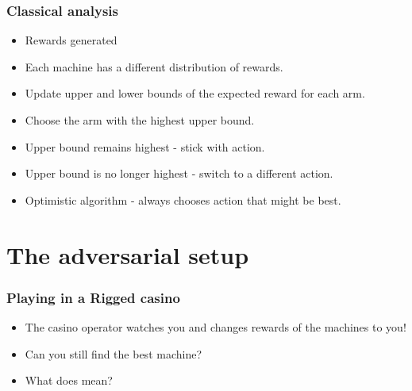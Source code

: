 \documentclass{beamer}
\begin{document}
\begin{frame}
\frametitle{Classical analysis}
\begin{itemize}
\item Rewards generated 
\item Each machine has a different distribution of rewards.
\item Update upper and lower bounds of the expected reward for each arm.
\item Choose the arm with the highest upper bound. 
\item {} Upper bound remains highest - stick with action.
\item {} Upper bound is no longer highest -
  switch to a different action.
\item Optimistic algorithm - always chooses action that might be best.
\end{itemize}
\end{frame}

\section{The adversarial setup}

\begin{frame}
\frametitle{Playing in a Rigged casino}
\begin{itemize}
\item The casino operator watches you and changes rewards of the
  machines to  you!
\item Can you still find the best machine?
\item What does  mean?
\end{itemize}
\end{frame}
\end{document}
